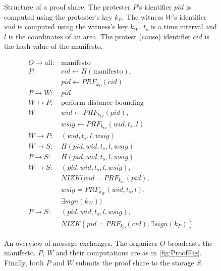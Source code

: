 \begin{columns}[t]
\begin{column}{0.32\linewidth}
\begin{figure}
\begin{tikzpicture}[%
        -Latex,
        item/.style={rectangle,draw},
        edge from parent/.style={},
        ]
      \end{tikzpicture}
      \caption{%
        Structure of a proof share.
        The protester \(P\)'s identifier \(pid\) is computed using the protester's 
        key \(k_P\).
        The witness \(W\)'s identifier \(wid\) is computed using the witness's key 
        \(k_W\).
        \(t_s\) is a time interval and \(l\) is the coordinates of an area.
        The protest (cause) identifier \(cid\) is the hash value of the manifesto.
      }%
      \label{ProofShare}
    \end{figure}%

    \begin{figure}
      \centering
      \begin{minipage}{\linewidth}
        \begin{align*}
          O\to \text{all}\colon & \text{manifesto} \\
          P\colon & cid\gets H(\text{manifesto}), \\
          & pid\gets PRF_{k_P}(cid) \\
          P\to W\colon & pid \\
          W\leftrightarrow P\colon & \text{perform distance bounding} \\
          W\colon & wid\gets PRF_{k_W}(pid), \\
          & wsig\gets PRF_{k_W}(wid, t_s, l) \\
          W\to P\colon & (wid, t_s, l, wsig) \\
          W\to S\colon & H(pid, wid, t_s, l, wsig) \\
          P\to S\colon & H(pid, wid, t_s, l, wsig) \\
          W\to S\colon & (pid, wid, t_s, l, wsig),\\
          & NIZK(wid = PRF_{k_W}(pid), \\
            & wsig = PRF_{k_W}(wid, t_s, l), \\
            & \exists sign(k_W)) \\
          P\to S\colon & (pid, wid, t_s, l, wsig),\\
          & NIZK(pid = PRF_{k_P}(cid), \exists sign(k_P))
        \end{align*}
      \end{minipage}
      \caption{%
        An overview of message exchanges.
        The organizer \(O\) broadcasts the manifesto.
        \(P\), \(W\) and their computations are as in \cref{fig:ProofFig}.
        Finally, both \(P\) and \(W\) submits the proof share to the storage \(S\).
      }%
      \label{Protocol}
    \end{figure}


\end{column}
\end{columns}
